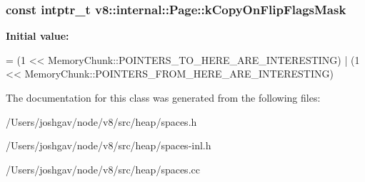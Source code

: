 \subsubsection[{\texorpdfstring{k\+Copy\+On\+Flip\+Flags\+Mask}{kCopyOnFlipFlagsMask}}]{\setlength{\rightskip}{0pt plus 5cm}const intptr\+\_\+t v8\+::internal\+::\+Page\+::k\+Copy\+On\+Flip\+Flags\+Mask\hspace{0.3cm}{\ttfamily [static]}}\hypertarget{classv8_1_1internal_1_1_page_a90064db403deda38844f31a9b86fab6c}{}\label{classv8_1_1internal_1_1_page_a90064db403deda38844f31a9b86fab6c}
{\bfseries Initial value\+:}
\begin{DoxyCode}
=
      (1 << MemoryChunk::POINTERS\_TO\_HERE\_ARE\_INTERESTING) |
      (1 << MemoryChunk::POINTERS\_FROM\_HERE\_ARE\_INTERESTING)
\end{DoxyCode}


The documentation for this class was generated from the following files\+:\begin{DoxyCompactItemize}
\item 
/\+Users/joshgav/node/v8/src/heap/spaces.\+h\item 
/\+Users/joshgav/node/v8/src/heap/spaces-\/inl.\+h\item 
/\+Users/joshgav/node/v8/src/heap/spaces.\+cc\end{DoxyCompactItemize}
